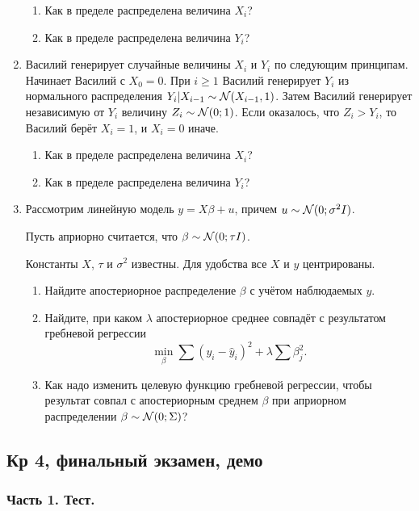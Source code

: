 \documentclass[12pt, a4paper]{article}\usepackage[]{graphicx}\usepackage[]{color}
\begin{document}
\begin{enumerate}
\begin{enumerate}
\item Как в пределе распределена величина $X_i$?
\item Как в пределе распределена величина $Y_i$?
\end{enumerate}


\item Василий генерирует случайные величины $X_i$ и $Y_i$ по следующим принципам. Начинает Василий с $X_0=0$. При $i\geq 1$ Василий генерирует $Y_i$ из нормального распределения $Y_i|X_{i-1}\sim \mathcal{N}(X_{i-1}, 1)$. Затем Василий генерирует независимую от $Y_i$ величину $Z_i \sim \mathcal{N}(0; 1)$. Если оказалось, что $Z_i>Y_i$, то Василий берёт $X_i=1$, и $X_i=0$ иначе.

\begin{enumerate}
\item Как в пределе распределена величина $X_i$?
\item Как в пределе распределена величина $Y_i$?
\end{enumerate}

\item Рассмотрим линейную модель $y=X\beta+u$, причем $u\sim \mathcal{N}(0;\sigma^2 I)$.

Пусть априорно считается, что $\beta \sim \mathcal{N}(0; \tau I)$.

Константы $X$, $\tau$ и $\sigma^2$ известны. Для удобства все $X$ и $y$ центрированы.

\begin{enumerate}
\item Найдите апостериорное распределение $\beta$ с учётом наблюдаемых $y$.
\item Найдите, при каком $\lambda$ апостериорное среднее совпадёт с результатом гребневой регрессии
\[
\min_{\beta} \sum (y_i - \hat y_i)^2 + \lambda \sum \beta_j^2.
\]
\item Как надо изменить целевую функцию гребневой регрессии, чтобы результат совпал с апостериорным среднем $\beta$ при априорном распределении $\beta \sim \mathcal{N}(0; \Sigma)$?
\end{enumerate}

\end{enumerate}




\subsection{Кр 4, финальный экзамен, демо}


\subsubsection*{Часть 1. Тест.}
\end{document}
